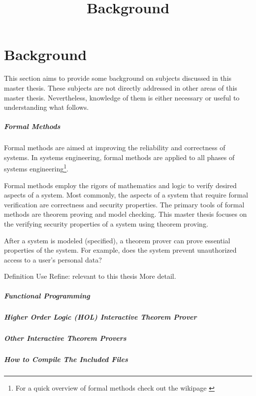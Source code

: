 \documentclass[../../main/main.tex]{subfiles}
\begin{document}
\title{Background}

\chapter{Background}
This section aims to provide some background on subjects discussed in this master thesis.  These subjects are not directly addressed in other areas of this master thesis.  Nevertheless, knowledge of them is either necessary or useful to understanding what follows.

\paragraph*{Formal Methods}
Formal methods are aimed at improving the reliability and correctness of systems\cite{formalmethodslcarke}.  In systems engineering, formal methods are applied to all phases of systems engineering\footnote{For a quick overview of formal methods check out the wikipage \cite{wikiformalmethods}}.   

Formal methods employ the rigors of mathematics and logic to verify desired aspects of a system.  Most commonly, the aspects of a system that require formal verification are correctness and security properties.  The primary tools of formal methods are theorem proving and model checking.  This master thesis focuses on the verifying security properties of a system using theorem proving.  

After a system is modeled (specified), a theorem prover can prove essential properties of the system.  For example, does the system prevent unauthorized access to a user's personal data?  


Definition
Use
Refine: relevant to this thesis
More detail.
\paragraph*{Functional Programming}
\paragraph*{Higher Order Logic (HOL) Interactive Theorem Prover}
\paragraph*{Other Interactive Theorem Provers}
\paragraph*{How to Compile The Included Files}
\end{document}
